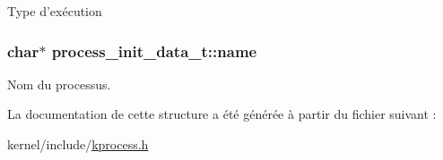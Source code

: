 \-Type d'exécution \hypertarget{structprocess__init__data__t_a6bdcab0bceaafa6e65a236904fb5a157}{
\subsubsection[{name}]{\setlength{\rightskip}{0pt plus 5cm}char$\ast$ {\bf process\-\_\-init\-\_\-data\-\_\-t\-::name}}}\label{structprocess__init__data__t_a6bdcab0bceaafa6e65a236904fb5a157}
\-Nom du processus. 

\-La documentation de cette structure a été générée à partir du fichier suivant \-:\begin{DoxyCompactItemize}
\item 
kernel/include/\hyperlink{kprocess_8h}{kprocess.\-h}\end{DoxyCompactItemize}
